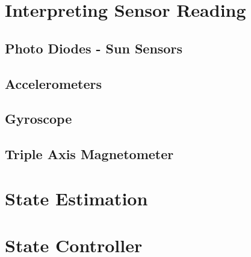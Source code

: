 \section{Interpreting Sensor Reading}
\label{sec:InterpretingSensorReading}

\subsection{Photo Diodes - Sun Sensors}
\label{sec:PhotoDiodes}

\subsection{Accelerometers}
\label{sec:Accelerometers}

\subsection{Gyroscope}
\label{sec:Gyroscope}

\subsection{Triple Axis Magnetometer}
\label{sec:TripleAxisMagnetometer}



\section{State Estimation}
\label{sec:StateEstimation}

\section{State Controller}
\label{sec:StateController}

